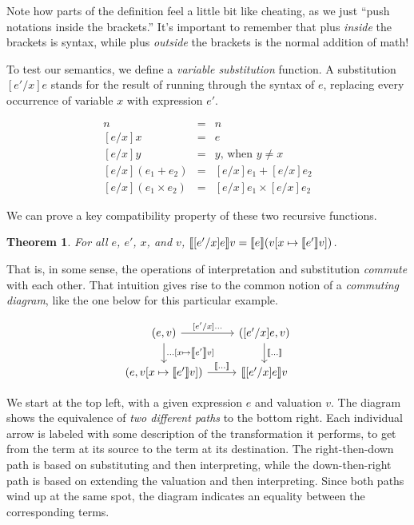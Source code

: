 \documentclass{amsbook}
\newtheorem{theorem}{Theorem}[chapter]
\theoremstyle{definition}
\theoremstyle{remark}
\numberwithin{section}{chapter}
\numberwithin{equation}{chapter}
\begin{document}
Note how parts of the definition feel a little bit like cheating, as we just ``push notations inside the brackets.''
It's important to remember that plus \emph{inside} the brackets is syntax, while plus \emph{outside} the brackets is the normal addition of math!

\newcommand{\subst}[3]{[#3/#2]#1}

To test our semantics, we define a \emph{variable substitution} function.
A substitution $\subst{e}{x}{e'}$ stands for the result of running through the syntax of $e$,
replacing every occurrence of variable $x$ with expression $e'$.

\begin{eqnarray*}
  \subst{n}{x}{e} &=& n \\
  \subst{x}{x}{e} &=& e \\
  \subst{y}{x}{e} &=& y \textrm{, when $y \neq x$} \\
  \subst{(e_1 + e_2)}{x}{e} &=& \subst{e_1}{x}{e} + \subst{e_2}{x}{e} \\
  \subst{(e_1 \times e_2)}{x}{e} &=& \subst{e_1}{x}{e} \times \subst{e_2}{x}{e}
\end{eqnarray*}

We can prove a key compatibility property of these two recursive functions.

\begin{theorem}
  For all $e$, $e'$, $x$, and $v$, $\denote{\subst{e}{x}{e'}}{v} = \denote{e}{(\mupd{v}{x}{\denote{e'}{v}})}$.
\end{theorem}

That is, in some sense, the operations of interpretation and substitution \emph{commute} with each other.
That intuition gives rise to the common notion of a \emph{commuting diagram}, like the one below for this particular example.

\[
\begin{tikzcd}
(e, v) \arrow{r}{\subst{\ldots}{x}{e'}} \arrow{d}{\mupd{\ldots}{x}{\denote{e'}v}} & (\subst{e}{x}{e'}, v) \arrow{d}{\denote{\ldots}} \\
(e, \mupd{v}{x}{\denote{e'}v}) \arrow{r}{\denote{\ldots}} & \denote{\subst{e}{x}{e'}}v
\end{tikzcd}
\]

We start at the top left, with a given expression $e$ and valuation $v$.
The diagram shows the equivalence of \emph{two different paths} to the bottom right.
Each individual arrow is labeled with some description of the transformation it performs, to get from the term at its source to the term at its destination.
The right-then-down path is based on substituting and then interpreting, while the down-then-right path is based on extending the valuation and then interpreting.
Since both paths wind up at the same spot, the diagram indicates an equality between the corresponding terms.
\end{document}
